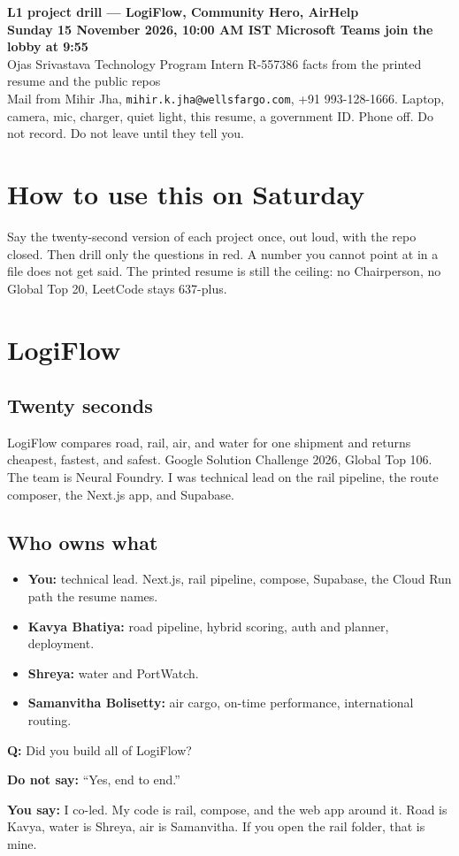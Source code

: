 \documentclass[a4paper,9.5pt]{extarticle}
\newcommand{\Q}[1]{\par\vspace{1.2pt}\noindent\textcolor{hot}{\textbf{Q:} #1}\par}
\newcommand{\Say}[1]{\noindent\textcolor{ok}{\textbf{You say:} #1}\par}
\newcommand{\No}[1]{\noindent\textcolor{muted}{\textbf{Do not say:} #1}\par}
\begin{document}
\begin{center}
  {\LARGE\textbf{L1 project drill --- LogiFlow, Community Hero, AirHelp}}\\[2pt]
  {\small\color{hot}\textbf{Sunday 15 November 2026, 10:00 AM IST \textbar{} Microsoft Teams \textbar{} join the lobby at 9:55}}\\[2pt]
  {\small Ojas Srivastava \textbar{} Technology Program Intern \textbar{} R-557386 \textbar{} facts from the printed resume and the public repos}\\[1pt]
  {\footnotesize\color{muted} Mail from Mihir Jha, \texttt{mihir.k.jha@wellsfargo.com}, +91 993-128-1666. Laptop, camera, mic, charger, quiet light, this resume, a government ID. Phone off. Do not record. Do not leave until they tell you.}
\end{center}

\section{How to use this on Saturday}
Say the twenty-second version of each project once, out loud, with the repo closed. Then drill only the questions in red. A number you cannot point at in a file does not get said. The printed resume is still the ceiling: no Chairperson, no Global Top 20, LeetCode stays 637-plus.

\section{LogiFlow}
\subsection{Twenty seconds}
LogiFlow compares road, rail, air, and water for one shipment and returns cheapest, fastest, and safest. Google Solution Challenge 2026, Global Top 106. The team is Neural Foundry. I was technical lead on the rail pipeline, the route composer, the Next.js app, and Supabase.

\subsection{Who owns what}
\begin{itemize}
  \item \textbf{You:} technical lead. Next.js, rail pipeline, compose, Supabase, the Cloud Run path the resume names.
  \item \textbf{Kavya Bhatiya:} road pipeline, hybrid scoring, auth and planner, deployment.
  \item \textbf{Shreya:} water and PortWatch.
  \item \textbf{Samanvitha Bolisetty:} air cargo, on-time performance, international routing.
\end{itemize}
\Q{Did you build all of LogiFlow?}
\No{``Yes, end to end.''}
\Say{I co-led. My code is rail, compose, and the web app around it. Road is Kavya, water is Shreya, air is Samanvitha. If you open the rail folder, that is mine.}
\end{document}
